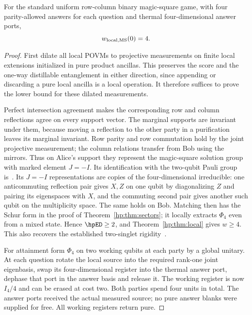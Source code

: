 \begin{theorem}\label{hp:thm:magic}
For the standard uniform row-column binary magic-square game, with four parity-allowed answers for each question and thermal four-dimensional answer ports,
\[
 w_{\rm local,MS}(0)=4.
\]
\end{theorem}
\begin{proof}
First dilate all local POVMs to projective measurements on finite local extensions initialized in pure product ancillas. This preserves the score and the one-way distillable entanglement in either direction, since appending or discarding a pure local ancilla is a local operation. It therefore suffices to prove the lower bound for these dilated measurements.

Perfect intersection agreement makes the corresponding row and column reflections agree on every support vector. The marginal supports are invariant under them, because moving a reflection to the other party in a purification leaves its marginal invariant. Row parity and row commutation hold by the joint projective measurement; the column relations transfer from Bob using the mirrors. Thus on Alice's support they represent the magic-square solution group with marked element $J=-I$. Its identification with the two-qubit Pauli group is~\cite[Proposition 6.10]{HPcs}. Its $J=-I$ representations are copies of the four-dimensional irreducible: one anticommuting reflection pair gives $X,Z$ on one qubit by diagonalizing $Z$ and pairing its eigenspaces with $X$, and the commuting second pair gives another such qubit on the multiplicity space. The same holds on Bob. Matching then has the Schur form in the proof of Theorem~\ref{hp:thm:sectors}; it locally extracts $\Phi_4$ even from a mixed state. Hence $\hpED\ge2$, and Theorem~\ref{hp:thm:local} gives $w\ge4$. This also recovers the established two-singlet rigidity~\cite[Appendix C, Lemma C.1 and its application]{HPwu}.

For attainment form $\Phi_4$ on two working qubits at each party by a global unitary. At each question rotate the local source into the required rank-one joint eigenbasis, swap its four-dimensional register into the thermal answer port, dephase that port in the answer basis and release it. The working register is now $I_4/4$ and can be erased at cost two. Both parties spend four units in total. The answer ports received the actual measured source; no pure answer blanks were supplied for free. All working registers return pure.
\end{proof}

